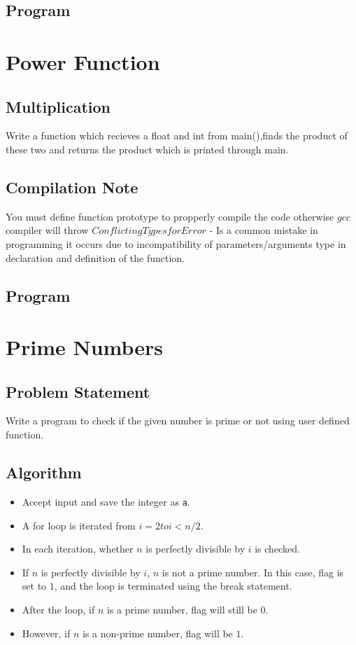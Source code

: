 \documentclass[11pt]{report}
\begin{document}
\section{Program}


\chapter{Power Function}
\section{Multiplication}
Write a function which recieves a float and int from main(),finds the product of these two and returns the product which is printed through main.
\section{Compilation Note}
You must define function prototype to propperly compile the code otherwise $gcc$ compiler will throw $Conflicting  Types  for  Error$ - Is a common mistake in programming it occurs due to incompatibility of parameters/arguments type in declaration and definition of the function.
\section{Program}
		

\chapter{Prime Numbers}
\section{Problem Statement}
Write a program to check if the given number is prime or not using user defined function. 
\section{Algorithm}
\begin{itemize}
  \item Accept input and save the integer as \texttt{a}.
  \item A for loop is iterated from $i = 2 to i < n/2$.
  \item In each iteration, whether $n$ is perfectly divisible by $i$ is checked.
  \item If $n$ is perfectly divisible by $i$, $n$ is not a prime number. In this case, flag is set to $1$, and the loop is terminated using the break statement.
  \item After the loop, if $n$ is a prime number, flag will still be $0$.
  \item However, if $n$ is a non-prime number, flag will be $1$.
\end{itemize}
\leavevmode
\end{document}
